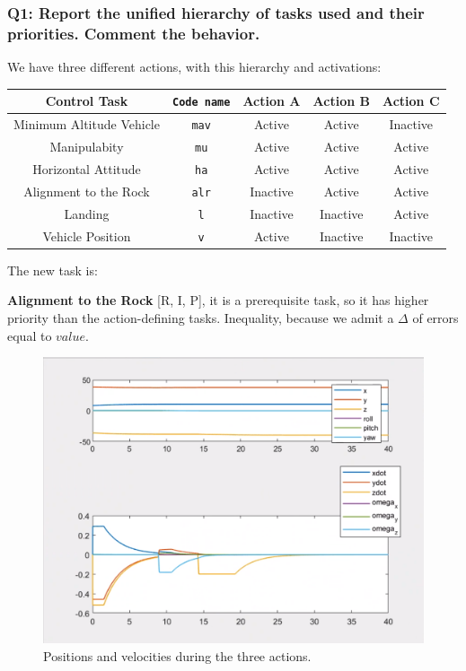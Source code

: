 \documentclass{article}
\newcommand{\ocio} {\marginpar{!}}
\begin{document}
\subsubsection{Q1: Report the unified hierarchy of tasks used and their priorities. Comment the behavior.}
We have three different actions, with this hierarchy and activations:
\begin{center}
\begin{tabular}{ | c | c | c | c | c |}
\hline
 Control Task & \texttt{Code name} & Action A & Action B & Action C\\
 \hline
 Minimum Altitude Vehicle &  \texttt{mav} & Active & Active & Inactive\\  
 Manipulabity &  \texttt{mu} & Active & Active & Active\\
 Horizontal Attitude &  \texttt{ha} & Active & Active & Active\\
 Alignment to the Rock & \texttt{alr} & Inactive & Active & Active \\
 Landing & \texttt{l} &Inactive & Inactive & Active \\
 Vehicle Position &  \texttt{v} &Active & Inactive & Inactive\\
 \hline
\end{tabular}
\end{center}
\vspace{5px}
\noindent
The new task is:
\begin{description}
\item \textbf{Alignment to the Rock} [R, I, P], it is a prerequisite task, so it has higher priority than the action-defining tasks. Inequality, because we admit a $\Delta$ of errors equal to $value$.   \ocio 
\end{description}

\begin{figure}[h]
    \centering
    \includegraphics[scale=0.3]{311_ppdot.png}
    \caption{Positions and velocities during the three actions.}
    \label{graphes3}
\end{figure}
\end{document}
